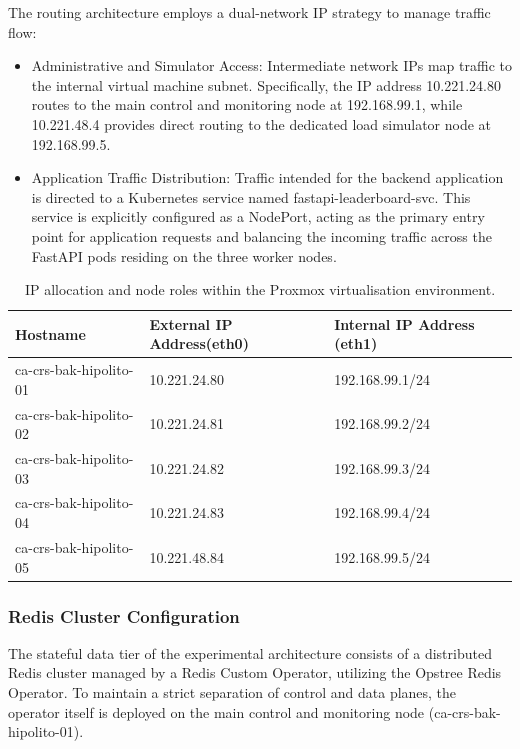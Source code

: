     The routing architecture employs a dual-network IP strategy to manage traffic flow:
    \begin{itemize}
        \item Administrative and Simulator Access: Intermediate network IPs map traffic to the internal virtual machine subnet. Specifically, the IP address 10.221.24.80 routes to the main control and monitoring node at 192.168.99.1, while 10.221.48.4 provides direct routing to the dedicated load simulator node at 192.168.99.5.
        \item Application Traffic Distribution: Traffic intended for the backend application is directed to a Kubernetes service named fastapi-leaderboard-svc. This service is explicitly configured as a NodePort, acting as the primary entry point for application requests and balancing the incoming traffic across the FastAPI pods residing on the three worker nodes.   

    \end{itemize}

\begin{table}[htbp]
    \centering
    \begin{tabular}{|l|l|l|}
        \hline
        \textbf{Hostname} & \textbf{External IP Address(eth0)} & \textbf{Internal IP Address (eth1)} \\
        \hline
        ca-crs-bak-hipolito-01 & 10.221.24.80 & 192.168.99.1/24 \\
        ca-crs-bak-hipolito-02 & 10.221.24.81 & 192.168.99.2/24 \\
        ca-crs-bak-hipolito-03 & 10.221.24.82 & 192.168.99.3/24 \\
        ca-crs-bak-hipolito-04 & 10.221.24.83 & 192.168.99.4/24 \\
        ca-crs-bak-hipolito-05 & 10.221.48.84 & 192.168.99.5/24 \\
        \hline
        \end{tabular}
    \caption{IP allocation and node roles within the Proxmox virtualisation environment.}
    \label{tab:infrastructure_ips}
\end{table}

\subsubsection{Redis Cluster Configuration}
\label{subsubsec:redis-cluster-configuration}

    The stateful data tier of the experimental architecture consists of a distributed Redis cluster managed by a Redis Custom Operator, utilizing the Opstree Redis Operator. To maintain a strict separation of control and data planes, the operator itself is deployed on the main control and monitoring node (ca-crs-bak-hipolito-01).


